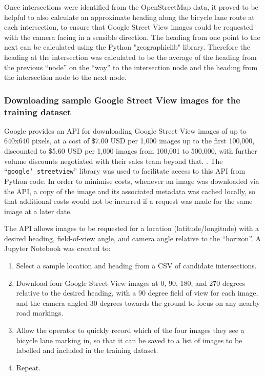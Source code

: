 \documentclass[11pt,twoside]{report}
\begin{document}
Once intersections were identified from the OpenStreetMap data, it proved to be helpful to also calculate an approximate heading along the bicycle lane route at each intersection, to ensure that Google Street View images could be requested with the camera facing in a sensible direction.  The heading from one point to the next can be calculated using the Python "geographiclib" library.  Therefore the heading at the intersection was calculated to be the average of the heading from the previous ``node'' on the ``way'' to the intersection node and the heading from the intersection node to the next node.

\subsubsection{Downloading sample Google Street View images for the training dataset}
\label{s:sample}

Google provides an API for downloading Google Street View images of up to 640x640 pixels, at a cost of \$7.00 USD per 1,000 images up to the first 100,000, discounted to \$5.60 USD per 1,000 images from 100,001 to 500,000, with further volume discounts negotiated with their sales team beyond that. \cite{gsv_billing}.  The ``\texttt{google\char`_streetview}'' library was used to facilitate access to this API from Python code.  In order to minimise costs, whenever an image was downloaded via the API, a copy of the image and its associated metadata was cached locally, so that additional costs would not be incurred if a request was made for the same image at a later date.

The API allows images to be requested for a location (latitude/longitude) with a desired heading, field-of-view angle, and camera angle relative to the ``horizon''.  A Jupyter Notebook was created to:

\begin{enumerate}
	\item{Select a sample location and heading from a CSV of candidate intersections.}
	\item{Download four Google Street View images at 0, 90, 180, and 270 degrees relative to the desired heading, with a 90 degree field of view for each image, and the camera angled 30 degrees towards the ground to focus on any nearby road markings.}
	\item{Allow the operator to quickly record which of the four images they see a bicycle lane marking in, so that it can be saved to a list of images to be labelled and included in the training dataset.}
	\item{Repeat.}
\end{enumerate}
\end{document}
